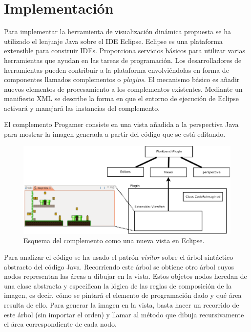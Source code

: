 \documentclass{llncs}
\begin{document}

\section{Implementación}
\label{sec:details}
Para implementar la herramienta de visualización dinámica propuesta se ha utilizado el lenjuaje Java sobre el IDE Eclipse. Eclipse es una plataforma extensible para construir IDEs. Proporciona servicios básicos para utilizar varias herramientas que ayudan en las tareas de programación. Los desarrolladores de herramientas pueden contribuir a la plataforma envolviéndolas en forma de componentes llamados complementos o \emph{plugins}. El mecanismo básico es añadir nuevos elementos de procesamiento a los complementos existentes. Mediante un manifiesto XML se describe la forma en que el entorno de ejecución de Eclipse activará y manejará las instancias del complemento. 

El complemento Progamer consiste en una vista añadida a la perspectiva Java para mostrar la imagen generada a partir del código que se está editando. 

\begin{figure}[ht]
\begin{center}
\includegraphics[scale=0.35]{images/crplugin.eps}
\caption{Esquema del complemento como una nueva vista en Eclipse.
\label{fig:crplugin}}
\end{center}
\end{figure}

Para analizar el código se ha usado el patrón \emph{visitor} sobre el árbol sintáctico abstracto del código Java. Recorriendo este árbol se obtiene otro árbol cuyos nodos representan las áreas a dibujar en la vista. Estos objetos nodos heredan de una clase abstracta y especifican la lógica de las reglas de composición de la imagen, es decir, cómo se pintará el elemento de programación dado y qué área resulta de ello. Para generar la imagen en la vista, basta hacer un recorrido de este árbol (sin importar el orden) y llamar al método que dibuja recursivamente el área correspondiente de cada nodo.
\end{document}
